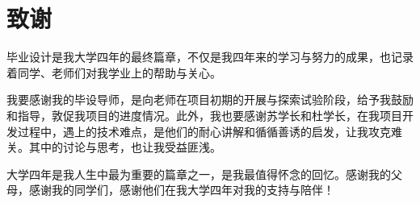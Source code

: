 \section*{致谢}
毕业设计是我大学四年的最终篇章，不仅是我四年来的学习与努力的成果，也记录着同学、老师们对我学业上的帮助与关心。

我要感谢我的毕设导师，是向老师在项目初期的开展与探索试验阶段，给予我鼓励和指导，敦促我项目的进度情况。此外，我也要感谢苏学长和杜学长，在我项目开发过程中，遇上的技术难点，是他们的耐心讲解和循循善诱的启发，让我攻克难关。其中的讨论与思考，也让我受益匪浅。

大学四年是我人生中最为重要的篇章之一，是我最值得怀念的回忆。感谢我的父母，感谢我的同学们，感谢他们在我大学四年对我的支持与陪伴！